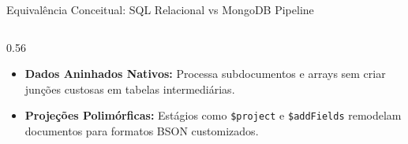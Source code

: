 \begin{frame}[fragile]{Equivalência Conceitual: SQL Relacional vs MongoDB Pipeline}
\begin{columns}[t,onlytextwidth]
\begin{column}{0.56\textwidth}
\begin{itemize}
        \item \textbf{Dados Aninhados Nativos:} Processa subdocumentos e arrays sem criar junções custosas em tabelas intermediárias.
        \item \textbf{Projeções Polimórficas:} Estágios como \lstinline[language=mongosh, basicstyle=\footnotesize\ttfamily]|$project| e \lstinline[language=mongosh, basicstyle=\footnotesize\ttfamily]|$addFields| remodelam documentos para formatos BSON customizados.
      \end{itemize}
    \end{column}
  \end{columns}
\end{frame}
